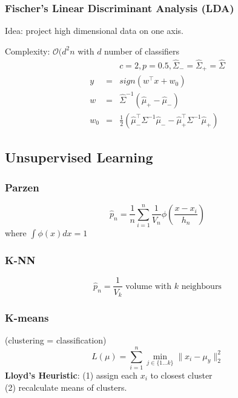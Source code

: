 \documentclass[main]{subfiles}
\begin{document}
\begin{landscape}
\begin{multicols}{4}
{\color{subsubsectionColor}\subsubsection{Fischer's Linear Discriminant Analysis (LDA)}}
Idea: project high dimensional data on one axis.

Complexity: $\mathcal{O}(d^2n$ with $d$ number of classifiers
\begin{eqnarray}
&& c=2, p=0.5, \hat{\Sigma}_- = \hat{\Sigma}_+ = \hat{\Sigma} \\
y &=& sign(w^\top x + w_0) \\
w &=& \hat{\Sigma}^{-1}(\hat{\mu}_+ - \hat{\mu}_-) \\
w_0 &=& \frac{1}{2}(\hat{\mu}_-^\top \Sigma^{-1} \hat{\mu}_- - \hat{\mu}_+^\top \Sigma^{-1} \hat{\mu}_+)
\end{eqnarray}


{\color{subsectionColor}\subsection{Unsupervised Learning}}
{\color{subsubsectionColor}\subsubsection{Parzen}}
\begin{equation}
\hat{p}_n = \frac{1}{n} \sum\limits_{i=1}^n \frac{1}{V_n} \phi(\frac{x-x_i}{h_n})
\end{equation}
where $\int \phi(x)dx = 1$
{\color{subsubsectionColor}\subsubsection{K-NN}}
\begin{equation}
\hat{p}_n = \frac{1}{V_k} \text{ volume with } k \text{ neighbours}
\end{equation}
{\color{subsubsectionColor}\subsubsection{K-means}}
(clustering = classification)
\begin{equation}
L(\mu) = \sum_{i=1}^{n} \min_{j\in\{1...k\}} \|x_i - \mu_y \|_2^2
\end{equation}
\textbf{Lloyd's Heuristic}: (1) assign each $x_i$ to closest cluster \\
(2) recalculate means of clusters.


\end{multicols}
\end{landscape}
\end{document}
